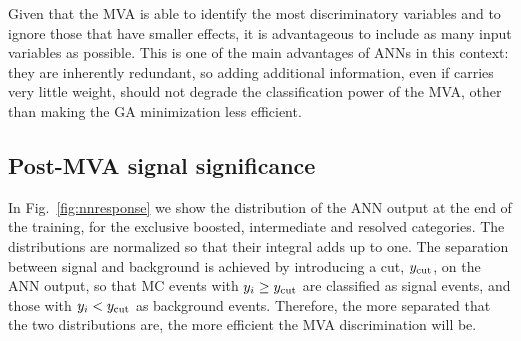 Given that the MVA is able to identify the most discriminatory variables
and to ignore those that have smaller effects, it is advantageous to
include as many input variables as possible.
%
This is one of the main advantages of ANNs in this context: they are
inherently redundant, so
adding additional information, even if carries very little weight,
should not degrade
the classification power of the MVA, other than making the GA
minimization less efficient.

\subsection{Post-MVA signal significance}
\label{sec:signalsignificance}

In Fig.~\ref{fig:nnresponse} we show the distribution of
the ANN output at the end of the training, for the exclusive
boosted, intermediate and resolved categories.
%
The distributions are normalized so that their integral
  adds up to one.
%
The  separation between signal and background is achieved by introducing
a cut, $y_{\rm cut}$, on the ANN output, so that MC events with $y_i\ge
y_{\rm cut}$ are classified as signal events, and those with
 $y_i <
y_{\rm cut}$ as background events.
%
Therefore,
the more separated that the two distributions are, the more efficient
the MVA discrimination will be.

